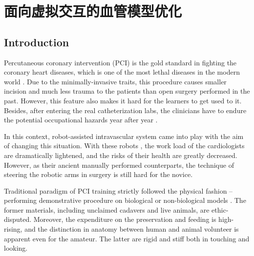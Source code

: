 \chapter{面向虚拟交互的血管模型优化}
\label{chap6}

\section{Introduction}

Percutaneous coronary intervention (PCI) is the gold standard in fighting the coronary heart diseases, which is one of the most lethal diseases in the modern world \cite{WHO2013}. %
Due to the minimally-invasive traits, this procedure causes smaller incision and much less trauma to the patients than open surgery performed in the past.
However, this feature also makes it hard for the learners to get used to it.
Besides, after entering the real catheterization labs, the clinicians have to endure the potential occupational hazards year after year \cite{Smilowitz2012}.

In this context, robot-assisted intravascular system came into play with the aim of changing this situation.
With these robots \cite{Beyar2006RNS,Smilowitz2012}, the work load of the cardiologists are dramatically lightened, and the risks of their health are greatly decreased.
However, as their ancient manually performed counterparts, the technique of steering the robotic arms in surgery is still hard for the novice.

Traditional paradigm of PCI training strictly followed the physical fashion -- performing demonstrative procedure on biological or non-biological models \cite{Lunderquist1995,Mori1998}. %
The former materials, including unclaimed cadavers and live animals, are ethic-disputed.
Moreover, the expenditure on the preservation and feeding is high-rising, and the distinction in anatomy between human and animal volunteer is apparent even for the amateur. %
The latter are rigid and stiff both in touching and looking.

